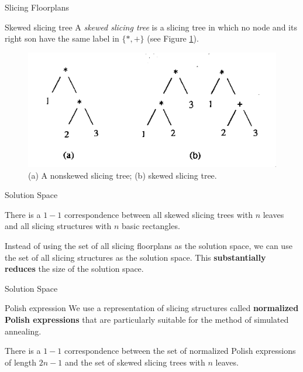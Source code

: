 \documentclass[xcolor=pdftex,dvipsnames,table]{beamer}
\begin{document}
\begin{frame}{Slicing Floorplans}
  \begin{block}{Skewed slicing tree}
    A \textit{skewed slicing tree} is a slicing tree in which no node and its right son have the same label in $\{*,+\}$ (see Figure \ref{fig:2}).
  \end{block}

  \begin{figure}
    \includegraphics[scale=0.5]{skewed_tree}
    \caption{(a) A nonskewed slicing tree; (b) skewed slicing tree.}
    \label{fig:2}
  \end{figure}
\end{frame}

\begin{frame}{Solution Space}
  \begin{lemma}\label{lemma:1}
    There is a $1-1$ correspondence between all skewed slicing trees with $n$ leaves and all slicing structures with $n$ basic rectangles.
  \end{lemma}

  Instead of using the set of all slicing floorplans as the solution space, we can use the set of all slicing structures as the solution space. This \textbf{substantially reduces} the size of the solution space.
\end{frame}

\begin{frame}{Solution Space}
  \begin{block}{Polish expression}
    We use a representation of slicing structures called \textbf{normalized Polish expressions} that are particularly suitable for the method of simulated annealing.
  \end{block}

  \begin{lemma}\label{lemma:2}
    There is a $1-1$ correspondence between the set of normalized Polish expressions of length $2n - 1$  and the set of skewed slicing trees with $n$ leaves.
  \end{lemma}
\end{frame}
\end{document}
